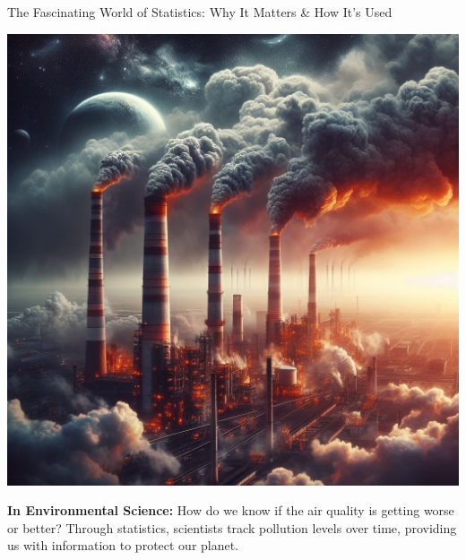 \documentclass[final]{beamer}
\begin{document}
\begin{frame}[t]{}
\begin{columns}[t]
\begin{column}{.33\textwidth}
\begin{block}{The Fascinating World of Statistics: Why It Matters \& How It's Used}
				\vspace{1cm}

				\begin{minipage}{0.3\textwidth}
					\centering
					\includegraphics[width=0.88\linewidth]{./images/2-2-2-AirPollution.jpeg}
				\end{minipage}
				\hfill
				\begin{minipage}{0.68\textwidth}
					\textbf{In Environmental Science:} How do we know if the air quality is getting worse or better? Through statistics, scientists track pollution levels over time, providing us with information to protect our planet.
				\end{minipage}

				\vspace{1cm}


\end{block}
\end{column}
\end{columns}
\end{frame}
\end{document}
